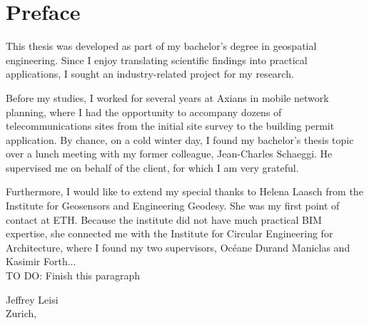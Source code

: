 \chapter*{Preface}

This thesis was developed as part of my bachelor's degree in geospatial engineering. Since I enjoy translating scientific findings into practical applications, I sought an industry-related project for my research.

Before my studies, I worked for several years at Axians in mobile network planning, where I had the opportunity to accompany dozens of telecommunications sites from the initial site survey to the building permit application. By chance, on a cold winter day, I found my bachelor's thesis topic over a lunch meeting with my former colleague, Jean-Charles Schaeggi. He supervised me on behalf of the client, for which I am very grateful.

Furthermore, I would like to extend my special thanks to Helena Laasch from the Institute for Geosensors and Engineering Geodesy. She was my first point of contact at ETH. Because the institute did not have much practical BIM expertise, she connected me with the Institute for Circular Engineering for Architecture, where I found my two supervisors, Océane Durand Maniclas and Kasimir Forth... \\

TO DO: Finish this paragraph

\begin{flushright}
Jeffrey Leisi \\
Zurich, \the\year
\end{flushright}